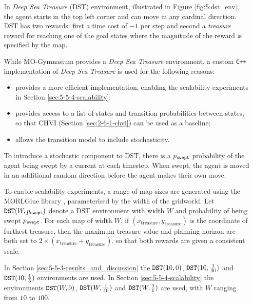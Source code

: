     In \textit{Deep Sea Treasure} (DST) environment, illustrated in Figure \ref{fig:5:dst_env}, the agent starts in the top left corner and can move in any cardinal direction. DST has two rewards: first a time cost of $-1$ per step and second a \textit{treasure} reward for reaching one of the goal states where the magnitude of the reward is specified by the map.

    While MO-Gymnasium provides a \textit{Deep Sea Treasure} environment, a custom \texttt{C++} implementation of \textit{Deep Sea Treasure} is used for the following reasons:
    \begin{itemize}
        \item provides a more efficient implementation, enabling the scalability experiments in Section \ref{sec:5-5-4-scalability};
        \item provides access to a list of states and transition probabilities between states, so that CHVI (Section \ref{sec:2-6-1-chvi}) can be used as a baseline;
        \item allows the transition model to include stochasticity.
    \end{itemize} 

    To introduce a stochastic component to DST, there is a ${p_\textnormal{\texttt{swept}}}$ probability of the agent being swept by a current at each timestep. When swept, the agent is moved in an additional random direction before the agent makes their own move.

    To enable scalability experiments, a range of map sizes are generated using the MORLGlue library \cite{morl_glue}, parameterised by the width of the gridworld. Let ${\textnormal{\texttt{DST}}}(W,{p_\textnormal{\texttt{swept}}})$ denote a DST environment with width $W$ and probability of being swept ${p_\textnormal{\texttt{swept}}}$. For each map of width $W$, if $(x_{\text{treasure}},y_{\text{treasure}})$ is the coordinate of furthest treasure, then the maximum treasure value and planning horizon are both set to $2\times (x_{\text{treasure}}+y_{\text{treasure}})$, so that both rewards are given a consistent scale.


    In Section \ref{sec:5-5-3-results_and_discussion} the ${\textnormal{\texttt{DST}}}(10,0)$, ${\textnormal{\texttt{DST}}}(10,\frac{1}{40})$ and ${\textnormal{\texttt{DST}}}(10,\frac{1}{5})$ environments are used. In Section \ref{sec:5-5-4-scalability} the environments ${\textnormal{\texttt{DST}}}(W,0)$, ${\textnormal{\texttt{DST}}}(W,\frac{1}{40})$ and ${\textnormal{\texttt{DST}}}(W,\frac{1}{5})$ are used, with $W$ ranging from $10$ to $100$.








